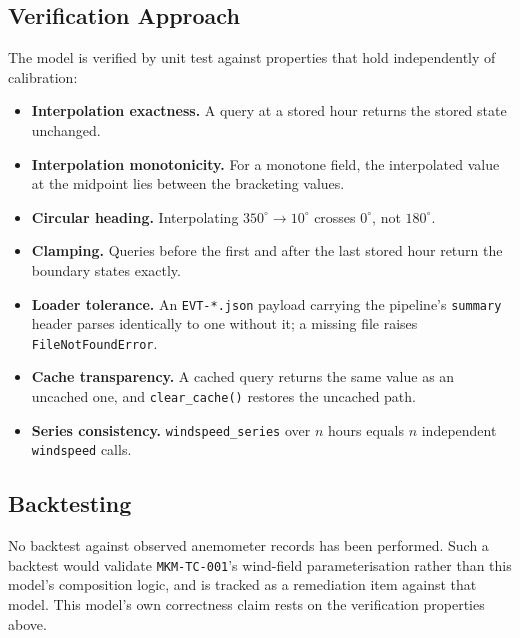 \documentclass[11pt,a4paper]{article}
\begin{document}
\mkmvalidation

\subsection{Verification Approach}
The model is verified by unit test against properties that hold independently of
calibration:

\begin{itemize}
  \item \textbf{Interpolation exactness.} A query at a stored hour returns the
        stored state unchanged.
  \item \textbf{Interpolation monotonicity.} For a monotone field, the
        interpolated value at the midpoint lies between the bracketing values.
  \item \textbf{Circular heading.} Interpolating $350^\circ \to 10^\circ$
        crosses $0^\circ$, not $180^\circ$.
  \item \textbf{Clamping.} Queries before the first and after the last stored
        hour return the boundary states exactly.
  \item \textbf{Loader tolerance.} An \texttt{EVT-*.json} payload carrying the
        pipeline's \texttt{summary} header parses identically to one without it;
        a missing file raises \texttt{FileNotFoundError}.
  \item \textbf{Cache transparency.} A cached query returns the same value as an
        uncached one, and \texttt{clear\_cache()} restores the uncached path.
  \item \textbf{Series consistency.} \texttt{windspeed\_series} over $n$ hours
        equals $n$ independent \texttt{windspeed} calls.
\end{itemize}

\subsection{Backtesting}
No backtest against observed anemometer records has been performed. Such a
backtest would validate \texttt{MKM-TC-001}'s wind-field parameterisation rather
than this model's composition logic, and is tracked as a remediation item
against that model. This model's own correctness claim rests on the verification
properties above.

\mkmtestresults
\end{document}
